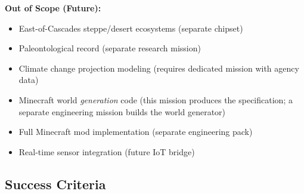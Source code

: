 \documentclass[11pt,letterpaper]{article}
\begin{document}
\textbf{Out of Scope (Future):}
\begin{itemize}[leftmargin=2em]
\item East-of-Cascades steppe/desert ecosystems (separate chipset)
\item Paleontological record (separate research mission)
\item Climate change projection modeling (requires dedicated mission with agency data)
\item Minecraft world \emph{generation} code (this mission produces the specification; a separate engineering mission builds the world generator)
\item Full Minecraft mod implementation (separate engineering pack)
\item Real-time sensor integration (future IoT bridge)
\end{itemize}

\subsection{Success Criteria}
\end{document}
